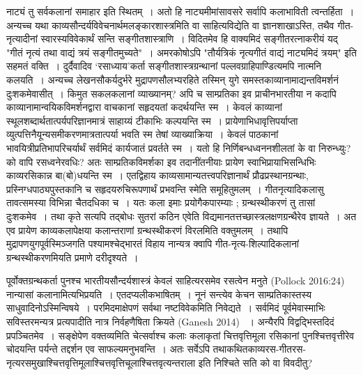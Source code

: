 {\dev नाट्यं तु सर्वकलानां समाहार इति स्थितम्~। अतो हि नाट्यमीमांसावसरे सर्वापि कलाभाविती त्वन्तर्हिता~। अन्यच्च यथा काव्यसौन्दर्यविवेचनार्थमलङ्कारशास्त्रमिति वा साहित्यविद्येति वा ज्ञानशाखाऽस्ति, तथैव गीत-नृत्यादीनां स्वारस्यविवेकार्थं सन्ति सङ्गीतशास्त्राणि~। विदितमेव हि वाक्यमिदं सङ्गीतरत्नाकरीयं यद् "गीतं नृत्यं तथा वाद्यं त्रयं सङ्गीतमुच्यते"~। अमरकोषोऽपि "तौर्यत्रिकं नृत्यगीतं वाद्यं नाट्यमिदं त्रयम्" इति सहमतं वक्ति~। दुर्दैवादिव ‘रसाध्याय’कर्ता सङ्गीतशास्त्रग्रन्थानां पल्लवग्राहिपाण्डित्यमपि नात्मनि कलयति~। अन्यच्च लेखनसौकर्यदुर्भरे मुद्रापणसौलभ्यरहिते तस्मिन् युगे समस्तकाव्यानामाद्यन्तविमर्शनं दुःशकमेवासीत्~। किमुत सकलकलानां व्याख्यानम्? अपि च साम्प्रतिका इव प्राचीनभारतीया न कदापि काव्यानामा\-न्वयिकविमर्शनद्वारा वाचकानां सहृदयतां कदर्थयन्ति स्म~। केवलं काव्यानां स्थूलशब्दार्थता\-त्पर्यपरिज्ञानमात्रं साहाय्यं टीकाभिः कल्पयन्ति स्म~। प्रायेणाभिधावृत्तिपर्याप्ता व्युत्पत्तिनैयून्य\-समीकरणमात्रतात्पर्या भवति स्म तेषां व्याख्याक्रिया~। केवलं पाठकानां भावयित्रीप्रतिभापरि\-चर्यार्थं सर्वमिदं कार्यजातं प्रवर्तते स्म~। यतो हि निर्णिबन्धध्वननशीलतां के वा निरुन्ध्युः? को वापि रसध्वनेरवधिः? अतः साम्प्रतिकविमर्शका इव तदानींतनीयाः प्रायेण स्वाभिप्रायाभि\-सन्धिभिः काव्यरसिकान्न बा(बो)धयन्ति स्म~। एतद्विहाय काव्यसामान्यतत्त्वपरिज्ञानार्थं प्रौढप्रस्थानग्रन्थाः, प्रस्निग्धपाठ्यपुस्तकानि च सहृदयरुचिरूपणार्थं प्रभवन्ति स्मेति समूहितुमलम्~। गीतनृत्यादिकलासु तावत्समस्या विभिन्ना चैतदधिका च~। यतः कला इमाः प्रयोगैकपारम्याः ; ग्रन्थस्थीकरणं तु तासां दुःशकमेव~। तथा कृते सत्यपि तद्बोधः सुतरां कठिन एवेति विद्यमानतत्तच्छास्त्रलक्षणग्रन्थैरेव ज्ञायते~। अत एव प्रायेण काव्यकलापेक्षया कलान्तराणां ग्रन्थस्थीकरणं विरलमिति वक्तुमलम्~। तथापि मुद्रापणयुगपूर्वस्मिञ्जगति पश्यामश्चेद्भारतं विहाय नान्यत्र क्वापि गीत-नृत्य-शिल्पादिकलानां ग्रन्थस्थीकरणमियति प्रमाणे दरीदृश्यते~।}

{\dev पूर्वोक्तग्रन्थकर्ता पुनश्च भारतीयसौन्दर्यशास्त्रं केवलं साहित्यरसमेव रसत्वेन मनुते} (Pollock 2016:24)  {\dev नान्यासां कलानामित्यभिप्रयति~। एतदप्यलीकभाषितम्~। नूनं सन्त्येव केचन साम्प्रतिकास्तस्य साधुवादिनोऽस्मिन्विषये~। परमिदमाक्षेपणं सर्वथा नष्टविवेकमिति निवेद्यते~। सर्वमिदं पूर्वमेवास्माभिः सविस्तरमन्यत्र प्रत्यपादीति नात्र निर्वहणैषिता क्रियते} (Ganesh 2014) {\dev~। अन्यैरपि विद्वद्भिस्तदिदं प्रपञ्चितमेव~। सङ्क्षेपेण वक्तव्यमिति चेत्सर्वाश्च कलाः कला\-कृतां चित्तवृत्तिमूला रसिकानां पुनश्चित्तवृत्तीरेव चोदयन्ति पर्यन्ते तद्दर्शन एव साफल्यमनु\-भवन्ति~। अतः सर्वेऽपि तथाकथितकाव्यरस-गीतरस-नृत्यरसमुखाश्चित्तवृत्तिमूलाश्चित्तवृत्ति\-चूलाश्चित्तवृत्यन्तराला इति निश्चिते सति को वा विवदीतु?}

